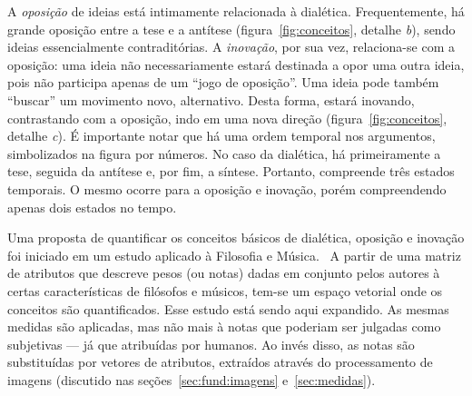 \begin{figure}[ht!]
\begin{center}
\vspace{30pt}
\fonteminha

\end{center}
\end{figure}

A \textit{oposição} de ideias está intimamente relacionada à
dialética. Frequentemente, há grande oposição entre a tese e a
antítese (figura~\ref{fig:conceitos}, detalhe \textit{b}), sendo
ideias essencialmente contraditórias. A \textit{inovação}, por sua
vez, relaciona-se com a oposição: uma ideia não necessariamente estará
destinada a opor uma outra ideia, pois não participa apenas de um
``jogo de oposição''. Uma ideia pode também ``buscar'' um movimento
novo, alternativo. Desta forma, estará inovando, contrastando com a oposição, indo em uma nova direção
(figura~\ref{fig:conceitos}, detalhe \textit{c}). É importante notar que há uma ordem temporal nos argumentos, simbolizados na figura por números. No caso da dialética, há primeiramente a tese, seguida da antítese e, por fim, a síntese. Portanto, compreende três estados temporais. O mesmo ocorre para a oposição e inovação, porém compreendendo apenas dois estados no tempo.

Uma proposta de quantificar os conceitos básicos de dialética,
oposição e inovação foi iniciado em um estudo aplicado à Filosofia e
Música.~\cite{vieira} A partir de uma matriz de atributos que descreve
pesos (ou notas) dadas em conjunto pelos autores à certas
características de filósofos e músicos, tem-se um espaço vetorial onde
os conceitos são quantificados. Esse estudo está sendo aqui expandido.
As mesmas medidas são aplicadas, mas não mais à notas que poderiam ser
julgadas como subjetivas --- já que atribuídas por humanos. Ao invés
disso, as notas são substituídas por vetores de atributos, extraídos
através do processamento de imagens (discutido nas
seções~\ref{sec:fund:imagens} e~\ref{sec:medidas}).

